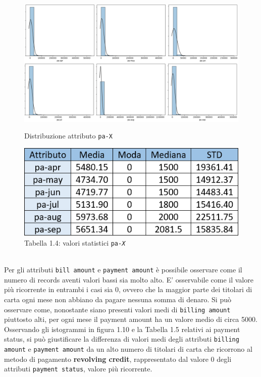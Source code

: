 \begin{figure}[!htb]
  \includegraphics[width=\linewidth]{img/pa-distribution.png}
  \caption{Distribuzione attributo \texttt{pa-X}}\label{pa-dist}
\endminipage\hfill
{}
  \includegraphics[width=\linewidth]{img/pa-stat.png}
\captionsetup{labelformat=empty}
\caption{Tabella 1.4: valori statistici \texttt{pa-\textit{X}}}
\label{pa-stat}
\endminipage\hfill
\end{figure}
\mbox{}\\
Per gli attributi \texttt{bill amount} e \texttt{payment amount} \`e possibile osservare come il numero di records aventi valori bassi sia molto alto. E' osservabile come il valore pi\`u ricorrente in entrambi i casi sia 0, ovvero che la maggior parte dei titolari di carta ogni mese non abbiano da pagare nessuna somma di denaro. Si pu\`o osservare come, nonostante siano presenti valori medi di \texttt{billing amount} piuttosto alti, per ogni mese il payment amount ha un valore medio di circa 5000. Osservando gli istogrammi in figura 1.10 e la Tabella 1.5 relativi ai payment status, si pu\`o giustificare la differenza di valori medi degli attributi \texttt{billing amount} e \texttt{payment amount} da un alto numero di titolari di carta che ricorrono al metodo di pagamento \textbf{revolving credit}, rappresentato dal valore 0 degli attributi \texttt{payment status}, valore pi\`u ricorrente.
